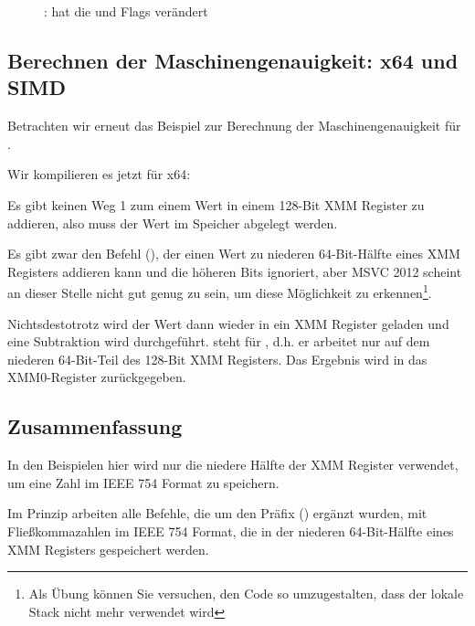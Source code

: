 \begin{figure}[H]
\centering
{}
\caption{\olly:  hat die \CF und \PF Flags verändert}
\label{fig:FPU_SIMD_d_max_olly}
\end{figure}

\subsection{Berechnen der Maschinengenauigkeit: x64 und SIMD}
\label{machine_epsilon_x64_and_SIMD}
Betrachten wir erneut das Beispiel zur Berechnung der Maschinengenauigkeit für \Tdouble
{}.

Wir kompilieren es jetzt für x64:


Es gibt keinen Weg 1 zum einem Wert in einem 128-Bit XMM Register zu addieren, also muss der Wert im Speicher abgelegt
werden.

Es gibt zwar den Befehl  (), der einen Wert zu niederen
64-Bit-Hälfte eines XMM Registers addieren kann und die höheren Bits ignoriert, aber MSVC 2012 scheint an dieser Stelle
nicht gut genug zu sein, um diese Möglichkeit zu erkennen\footnote{Als Übung können Sie versuchen, den Code so
umzugestalten, dass der lokale Stack nicht mehr verwendet wird}.

Nichtsdestotrotz wird der Wert dann wieder in ein XMM Register geladen und eine Subtraktion wird durchgeführt.
 steht für , d.h. er arbeitet nur auf dem niederen
64-Bit-Teil des 128-Bit XMM Registers.
Das Ergebnis wird in das XMM0-Register zurückgegeben.



\subsection{Zusammenfassung}
In den Beispielen hier wird nur die niedere Hälfte der XMM Register verwendet, um eine Zahl im IEEE 754 Format zu
speichern.

Im Prinzip arbeiten alle Befehle, die um den Präfix  () ergänzt wurden, mit
Fließkommazahlen im IEEE 754 Format, die in der niederen 64-Bit-Hälfte eines XMM Registers gespeichert werden.

